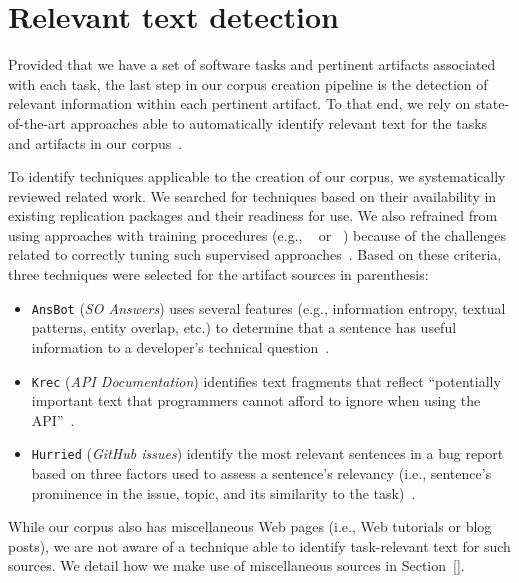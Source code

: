 


\section{Relevant text detection}
\label{cp4:corpus-relevant-text}


Provided that we have a set of software tasks and pertinent artifacts associated with each task, 
the last step in our corpus creation pipeline is the detection of relevant information within 
each pertinent artifact. To that end, we rely on state-of-the-art approaches able to automatically identify relevant text for the tasks and artifacts in our corpus~\cite{nadi2020, Robillard2015, Lotufo2012, Xu2017}.


To identify techniques applicable to the creation of our corpus, we systematically reviewed related work. We searched for techniques based on their availability in existing replication packages and their readiness for use.
We also refrained from using approaches with training procedures (e.g., ~\cite{liu2020} or ~\cite{Treude2016}) because of the challenges related to correctly tuning such supervised approaches~\cite{Chaparro2017, fucci2019}. Based on these criteria, three techniques were selected for the artifact sources in parenthesis:


\begin{itemize}[leftmargin=\parindent, font=\normalfont\itshape]
    \item \texttt{\acs{AnsBot}} (\textit{SO Answers}) uses several features (e.g., information entropy, textual patterns, entity overlap, etc.) to determine that a sentence has useful information to a developer's technical question~\cite{Xu2017}.
    
    \item \texttt{\acs{Krec}} (\textit{API Documentation}) identifies text fragments that reflect ``potentially important text that programmers cannot afford to ignore when using the API''~\cite{Robillard2015}.
    
    \item \texttt{\acs{Hurried}} (\textit{GitHub issues}) identify the most relevant sentences in a bug report based on three factors used to assess a sentence's relevancy (i.e., sentence's prominence in the issue, topic, and its similarity to the task)~\cite{Lotufo2012}.
\end{itemize}



While our corpus also has miscellaneous Web pages (i.e., Web tutorials or blog posts), we are not aware of a technique able to identify task-relevant text for such sources. We detail how we make use of miscellaneous sources in Section~\ref{}.


